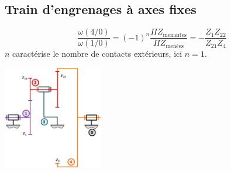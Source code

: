 \subsection*{Train d'engrenages à axes fixes}
\begin{minipage}[c]{.45\linewidth}
\begin{resultat}
$$
\dfrac{\omega(4/0)}{\omega(1/0)}= (-1)^n \dfrac{\Pi Z_{\text{menantes}}}{\Pi Z_{\text{menées}}}=-\dfrac{Z_1Z_{22}}{Z_{21}Z_4}
$$
$n$ caractérise le nombre de contacts extérieurs, ici $n=1$.
\end{resultat}
\end{minipage}\hfill
\begin{minipage}[c]{.5\linewidth}
\begin{center}
\includegraphics[height=4.5cm]{images/fig_06.png}
\end{center}
\end{minipage}


